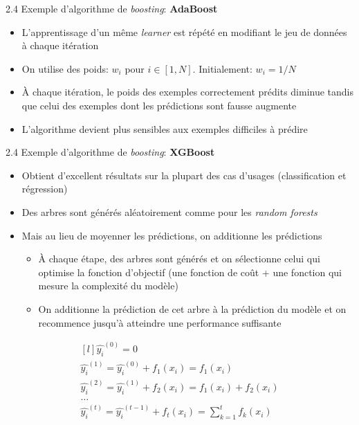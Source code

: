 \begin{frame}{2.4 Exemple d'algorithme de \textit{boosting}: \textbf{AdaBoost}}
  \begin{itemize}
  \item L'apprentissage d'un même \textit{learner} est répété en modifiant le jeu de données à chaque itération
  \item On utilise des poids: $w_{i}$ pour $i \in [1,N]$. Initialement: $w_{i} = 1/N$
  \item À chaque itération, le poids des exemples correctement prédits diminue tandis que celui des exemples dont les prédictions sont fausse augmente
  \item L'algorithme devient plus sensibles aux exemples difficiles à prédire
  \end{itemize}
\end{frame}

\begin{frame}{2.4 Exemple d'algorithme de \textit{boosting}: \textbf{XGBoost}}
  \begin{itemize}
  \item Obtient d'excellent résultats sur la plupart des cas d'usages (classification et régression)
  \item Des arbres sont générés aléatoirement comme pour les \textit{random forests}
  \item Mais au lieu de moyenner les prédictions, on additionne les prédictions
    \begin{itemize}
    \item À chaque étape, des arbres sont générés et on sélectionne celui qui optimise la fonction d'objectif (une fonction de coût + une fonction qui mesure la complexité du modèle)
    \item On additionne la prédiction de cet arbre à la prédiction du modèle et on recommence jusqu'à atteindre une performance suffisante
    \end{itemize}
  \end{itemize}
  \begin{equation*}
    \begin{matrix*}[l]
      \hat{y_{i}}^{(0)} = 0 \\
      \hat{y_{i}}^{(1)} = \hat{y_{i}}^{(0)} + f_{1}(x_{i}) = f_{1}(x_{i})\\
      \hat{y_{i}}^{(2)} = \hat{y_{i}}^{(1)} + f_{2}(x_{i}) = f_{1}(x_{i}) + f_{2}(x_{i})\\
      \dots\\
      \hat{y_{i}}^{(t)} = \hat{y_{i}}^{(t-1)} + f_{t}(x_{i}) = \displaystyle\sum_{k=1}^{t} f_{k}(x_{i}) \\
    \end{matrix*}
  \end{equation*}
\end{frame}

